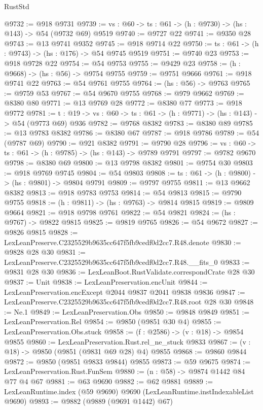 \begin{lexlean}{RustStd}
\begin{coremodule}
@9732 := @918 @9731
@9739 := {vs : @60} -> {ts : @61} -> (h : @9730) -> (hs : @143) -> @54 (@9732 @69) @9519
@9740 := @9727 @22
@9741 := @9350 @28
@9743 := @13 @9741 @9352
@9745 := @918 @9714 @22
@9750 := {ts : @61} -> (h : @9743) -> (hs : @176) -> @54 @9745 @9519
@9751 := @9740 @23
@9753 := @918 @9728 @22
@9754 := @54 @9753
@9755 := @9429 @23
@9758 := (h : @9668) -> (hs : @56) -> @9754 @9755
@9759 := @9751 @9666
@9761 := @918 @9741 @22
@9763 := @54 @9761 @9755
@9764 := (hs : @56) -> @9763
@9765 := @9759 @53
@9767 := @54 @9670 @9755
@9768 := @979 @9662
@9769 := @8380 @80
@9771 := @13 @9769 @28
@9772 := @8380 @77
@9773 := @918 @9772
@9781 := {t : @19} -> {vs : @60} -> {ts : @61} -> (h : @9771) -> (hs : @143) -> @54 (@9773 @69) @936
@9782 := @9768 @8382
@9783 := @8380 @89
@9785 := @13 @9783 @8382
@9786 := @8380 @67
@9787 := @918 @9786
@9789 := @54 (@9787 @69)
@9790 := @921 @8382
@9791 := @9790 @28
@9796 := {vs : @60} -> {ts : @61} -> (h : @9785) -> (hs : @143) -> @9789 @9791
@9797 := @9782 @9670
@9798 := @8380 @69
@9800 := @13 @9798 @8382
@9801 := @9754 @30
@9803 := @918 @9769 @9745
@9804 := @54 @9803
@9808 := {ts : @61} -> (h : @9800) -> (hs : @9801) -> @9804 @9791
@9809 := @9797 @9755
@9811 := @13 @9662 @8382
@9813 := @918 @9783 @9753
@9814 := @54 @9813
@9815 := @9790 @9755
@9818 := (h : @9811) -> (hs : @9763) -> @9814 @9815
@9819 := @9809 @9664
@9821 := @918 @9798 @9761
@9822 := @54 @9821
@9824 := (hs : @9767) -> @9822 @9815
@9825 := @9819 @9765
@9826 := @54 @9672
@9827 := @9826 @9815
@9828 := LexLeanPreserve.C2325529b9635cc647f5fb9cedf0d2cc7.R48.denote
@9830 := @9828 @28 @30
@9831 := LexLeanPreserve.C2325529b9635cc647f5fb9cedf0d2cc7.R48.__fits_0
@9833 := @9831 @28 @30
@9836 := LexLeanBoot.RustValidate.correspondCrate @28 @30
@9837 := Unit
@9838 := LexLeanPreservation.encUnit
@9844 := LexLeanPreservation.encExcept @2044 @9837 @2041 @9838 @9836
@9847 := LexLeanPreserve.C2325529b9635cc647f5fb9cedf0d2cc7.R48.root @28 @30
@9848 := Ne.{1}
@9849 := LexLeanPreservation.Obs
@9850 := @9848 @9849
@9851 := LexLeanPreservation.Rel
@9854 := @9850 (@9851 @30 @4)
@9855 := LexLeanPreservation.Obs.stuck
@9858 := (f : @2586) -> (v : @18) -> @9854 @9855
@9860 := LexLeanPreservation.Rust.rel_ne_stuck @9833
@9867 := (v : @18) -> @9850 (@9851 (@9831 @69 @28) @4) @9855
@9868 := @9860 @9844
@9872 := @9850 (@9851 @9833 @9844) @9855
@9873 := @59 @9675
@9874 := LexLeanPreservation.Rust.FunSem
@9880 := (n : @58) -> @9874 @1442 @84 @77 @4 @67
@9881 := @63 @9690
@9882 := @62 @9881
@9889 := LexLeanRuntime.index (@59 @9690) @9690 (LexLeanRuntime.instIndexableList @9690)
@9893 := @9882 (@9889 (@9691 @1442) @67)

\end{coremodule}
\end{lexlean}
